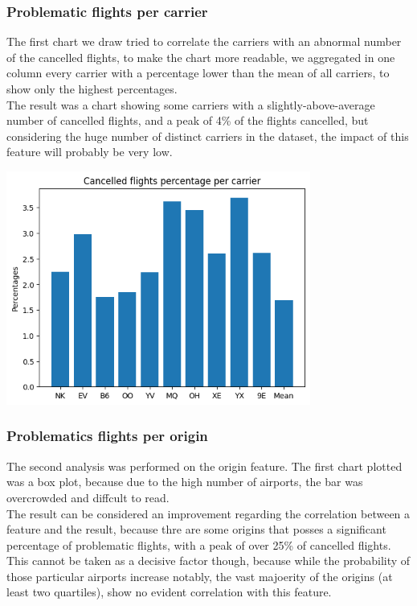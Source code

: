 \documentclass[
	letterpaper, %
	10pt, %
]{class}
\begin{document}
\subsubsection{Problematic flights per carrier}
The first chart we draw tried to correlate the carriers with an abnormal number of the cancelled flights, to make the chart more readable, we aggregated in one column every carrier with a percentage lower than the mean of all carriers, to show only the highest percentages.\\

The result was a chart showing some carriers with a slightly-above-average number of cancelled flights, and a peak of 4\% of the flights  cancelled, but considering the huge number of distinct carriers in the dataset, the impact of this feature will probably be very low.

\begin{center}
    \includegraphics[width=10cm]{../images/cancelled_per_carrier.png}
\end{center}

\subsubsection{Problematics flights per origin}
The second analysis was performed on the origin feature.
The first chart plotted was a box plot, because due to the high number of airports, the bar was overcrowded and diffcult to read.\\

The result can be considered an improvement regarding the correlation between a feature and the result, because thre are some origins that posses a significant percentage
of problematic flights, with a peak of over 25\% of cancelled flights. This cannot be taken as a decisive factor though, because while the probability of those particular airports increase notably, the vast majoerity of the origins (at least two quartiles), show no evident correlation with this feature.
\end{document}
